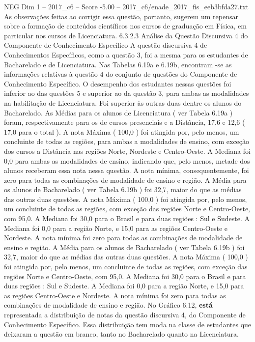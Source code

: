 \begin{textsample}{NEG Dim 1 – 2017\_c6 – Score -5.00 – 2017\_c6/enade\_2017\_fis\_eeb3bfda27.txt}
As observações feitas ao corrigir essa questão, portanto, sugerem um repensar sobre a formação de conteúdos científicos nos cursos de graduação em Física, em particular nos cursos de Licenciatura. 6.3.2.3 Análise da Questão Discursiva 4 do Componente de Conhecimento Específico A questão discursiva 4 de Conhecimentos Específicos, como a questão 3, foi a mesma para os estudantes de Bacharelado e de Licenciatura.
Nas Tabelas 6.19a e 6.19b, encontram -se as informações relativas à questão 4 do conjunto de questões do Componente de Conhecimento Específico.
O desempenho dos estudantes nessas questões foi inferior ao das questões 5 e superior ao da questão 3, para ambas as modalidades na habilitação de Licenciatura.
Foi superior às outras duas dentre os alunos do Bacharelado.
As Médias para os alunos de Licenciatura ( ver Tabela 6.19a ) foram, respectivamente para os de cursos presenciais e a Distância, 17,6 e 12,6 ( 17,0 para o total ).
A nota Máxima ( 100,0 ) foi atingida por, pelo menos, um concluinte de todas as regiões, para ambas a modalidades de ensino, com exceção dos cursos a Distância nas regiões Norte, Nordeste e Centro-Oeste.
A Mediana foi 0,0 para ambas as modalidades de ensino, indicando que, pelo menos, metade dos alunos receberam essa nota nessa questão.
A nota mínima, consequentemente, foi zero para todas as combinações de modalidade de ensino e região.
A Média para os alunos de Bacharelado ( ver Tabela 6.19b ) foi 32,7, maior do que as médias das outras duas questões.
A nota Máxima ( 100,0 ) foi atingida por, pelo menos, um concluinte de todas as regiões, com exceção das regiões Norte e Centro-Oeste, com 95,0.
A Mediana foi 30,0 para o Brasil e para duas regiões : Sul e Sudeste.
A Mediana foi 0,0 para a região Norte, e 15,0 para as regiões Centro-Oeste e Nordeste.
A nota mínima foi zero para todas as combinações de modalidade de ensino e região.
A Média para os alunos de Bacharelado ( ver Tabela 6.19b ) foi 32,7, maior do que as médias das outras duas questões.
A nota Máxima ( 100,0 ) foi atingida por, pelo menos, um concluinte de todas as regiões, com exceção das regiões Norte e Centro-Oeste, com 95,0.
A Mediana foi 30,0 para o Brasil e para duas regiões : Sul e Sudeste.
A Mediana foi 0,0 para a região Norte, e 15,0 para as regiões Centro-Oeste e Nordeste.
A nota mínima foi zero para todas as combinações de modalidade de ensino e região.
No Gráfico 6.12, \textbf{está} representada a distribuição de notas da questão discursiva 4, do Componente de Conhecimento Específico.
Essa distribuição tem moda na classe de estudantes que deixaram a questão em branco, tanto no Bacharelado quanto na Licenciatura.

\end{textsample}
